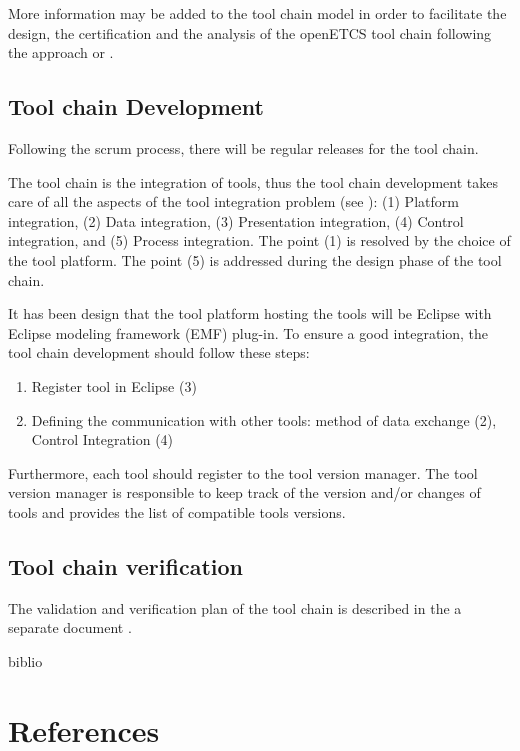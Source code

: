 \documentclass{openetcs_article}
\begin{document}
More information may be added to the tool chain model in
order to facilitate the design, the certification and the analysis  of
the openETCS tool chain following the approach
\cite{slotosch_model-based_2012} or \cite{asplund_towards_2012}.

\subsection{Tool chain Development}
Following the scrum process, there will be regular releases for the tool chain.

The tool chain is the integration of  tools, thus the tool chain development
takes care of all the aspects of the tool integration problem (see  
\cite{wasserman_tool_1990}): (1) Platform integration, (2) Data integration,
(3) Presentation integration, (4) Control integration, and (5) Process
integration.
The point (1) is resolved by the choice of the tool platform. The point (5) is
addressed during the design phase of the tool chain.

It has been design that the tool platform hosting the tools will be
Eclipse with Eclipse modeling framework (\gls{EMF}) plug-in. 
To ensure a good  integration, the tool chain development should follow these steps:
\begin{enumerate}
\item Register tool in Eclipse (3)
\item Defining the communication with other tools: method of data exchange (2),
  Control Integration (4)
\end{enumerate}


Furthermore, each tool should register to the tool version
manager. The tool version manager is responsible to keep track of the
version and/or changes of tools and provides the list of compatible
tools versions.

\subsection{Tool chain  verification}
The validation and verification plan of the tool chain is described in the
a separate  document \cite{}.



\begin{btSect}{biblio}
\section{References}
\btPrintAll
\end{btSect}


\appendix






\end{document}
